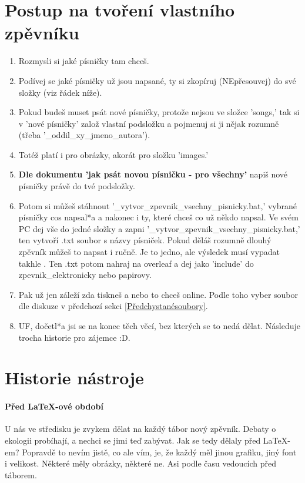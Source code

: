 \documentclass[12pt, notitlepage]{scrartcl}
\begin{document}
\section{Postup na tvoření vlastního zpěvníku}
\begin{enumerate}
    \item Rozmysli si jaké písničky tam chceš.
    \item Podívej se jaké písničky už jsou napsané, ty si zkopíruj (NEpřesouvej) do své složky (viz řádek níže).
    \item Pokud budeš muset psát nové písničky, protože nejsou ve složce 'songs,' tak si v 'nové písničky' založ vlastní podsložku a pojmenuj si ji nějak rozumně (třeba '\_oddil\_xy\_jmeno\_autora').
    \item Totéž platí i pro obrázky, akorát pro složku 'images.'
    \item \textbf{Dle dokumentu 'jak psát novou písničku - pro všechny'} napiš nové písničky právě do tvé podsložky.
    \item Potom si můžeš stáhnout '\_vytvor\_zpevnik\_vsechny\_pisnicky.bat,' vybrané písničky cos napsal*a a nakonec i ty, které chceš co už někdo napsal. Ve svém PC dej vše do jedné složky a zapni '\_vytvor\_zpevnik\_vsechny\_pisnicky.bat,' ten vytvoří .txt soubor s názvy písniček. Pokud děláš rozumně dlouhý zpěvník můžeš to napsat i ručně. Je to jedno, ale výsledek musí vypadat takhle \cite{add}. Ten .txt potom nahraj na overleaf a dej jako 'include' do zpevnik\_elektronicky nebo papirovy.
    \item Pak už jen záleží zda tiskneš a nebo to chceš online. Podle toho vyber soubor dle diskuze v předchozí sekci \ref{Předchystanésoubory}.
    \item UF, dočetl*a jsi se na konec těch věcí, bez kterých se to nedá dělat. Následuje trocha historie pro zájemce :D.
\end{enumerate}


\section{Historie nástroje}
\paragraph{Před \LaTeX -ové období}
U nás ve středisku je zvykem dělat na každý tábor nový zpěvník. Debaty o ekologii probíhají, a nechci se jimi teď zabývat. Jak se tedy dělaly před \LaTeX -em? Popravdě to nevím jistě, co ale vím, je, že každý měl jinou grafiku, jiný font i velikost. Některé měly obrázky, některé ne. Asi podle času vedoucích před táborem. 
\end{document}
